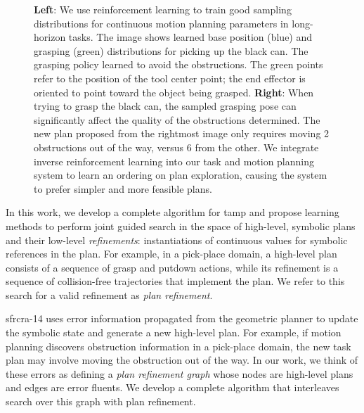 \begin{figure}[t]
  \caption{\small{\textbf{Left}: We use reinforcement learning to train good sampling distributions for
      continuous motion planning parameters in long-horizon tasks.
      The image shows learned base position (blue) and
      grasping (green) distributions for picking up the black can. The grasping
      policy learned to avoid the obstructions. The green points refer
      to the position of the tool center point; the end effector is oriented
      to point toward the object being grasped. \textbf{Right}: When trying to grasp the black can, the sampled grasping pose can
      significantly affect the quality of the obstructions determined. The new plan proposed from the rightmost image only
      requires moving 2 obstructions out of the way, versus 6 from the other. We integrate inverse reinforcement learning into our task and
      motion planning system to learn an ordering on plan exploration, causing the system to prefer simpler and more feasible plans.}}
  \label{fig:cover}
\end{figure}

In this work, we develop a complete algorithm for {\sc tamp} and propose learning
methods to perform joint guided search in the space of
high-level, symbolic plans and their low-level
\emph{refinements}: instantiations of continuous values for
symbolic references in the plan. For example, in a pick-place domain, a high-level plan
consists of a sequence of grasp and putdown actions, while its refinement is a sequence of
collision-free trajectories that implement the plan. We refer to this search for a valid
refinement as \emph{plan refinement}.

{\sc sfrcra-14} uses error information propagated from the geometric planner
to update the symbolic state and generate a new high-level plan.
For example, if motion planning discovers obstruction information in a pick-place domain, the
new task plan may involve moving the obstruction out of the way.
In our work, we think of these errors as defining a \emph{plan refinement graph} whose nodes are high-level plans
and edges are error fluents. We develop a complete algorithm that interleaves
search over this graph with plan refinement.


